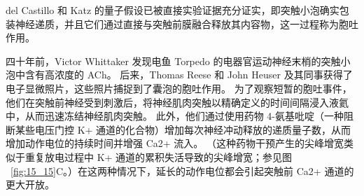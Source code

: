 del Castillo 和 Katz 的量子假设已被直接实验证据充分证实，即突触小泡确实包装神经递质，并且它们通过直接与突触前膜融合释放其内容物，这一过程称为胞吐作用。


四十年前，Victor Whittaker 发现电鱼 Torpedo 的电器官运动神经末梢的突触小泡中含有高浓度的 ACh。
后来，Thomas Reese 和 John Heuser 及其同事获得了电子显微照片，这些照片捕捉到了囊泡的胞吐作用。 为了观察短暂的胞吐事件，他们在突触前神经受到刺激后，将神经肌肉突触以精确定义的时间间隔浸入液氦中，从而迅速冻结神经肌肉突触。
此外，他们通过使用药物 4-氨基吡啶（一种阻断某些电压门控 K+ 通道的化合物）增加每次神经冲动释放的递质量子数，从而增加动作电位的持续时间并增强 Ca2+ 流入。
（这种药物干预产生的尖峰增宽类似于重复放电过程中 K+ 通道的累积失活导致的尖峰增宽；参见图 ~\ref{fig:15_15}C。）在这两种情况下，延长的动作电位都会引起突触前 Ca2+ 通道的更大开放。


